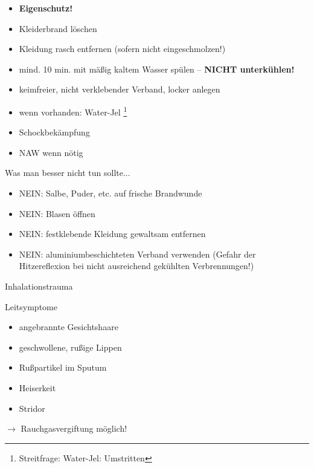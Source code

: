 \documentclass{article}
\newcommand\gEs[1]{\textbf{\textcolor[rgb]{0.0,0.0,0.5019608}{#1}}}
\newcommand\gEs[1]{\textbf{\textcolor[rgb]{0.0,0.0,0.5019608}{#1}}}
\begin{document}
\begin{itemize}
\item {\mdseries\color[rgb]{0.0,0.0,0.5019608}
\gEs{Eigenschutz!}}

\item {\mdseries\color[rgb]{0.0,0.0,0.5019608}
Kleiderbrand l\"oschen}

\item {\mdseries\color[rgb]{0.0,0.0,0.5019608}
Kleidung rasch entfernen (sofern nicht  eingeschmolzen!)}

\item {\mdseries\color[rgb]{0.0,0.0,0.5019608}
mind. 10 min. mit m\"a{\ss}ig kaltem Wasser  sp\"ulen --
\gEs{NICHT unterk\"uhlen!}}

\item {\mdseries\color[rgb]{0.0,0.0,0.5019608}
keimfreier, nicht verklebender Verband, locker anlegen }

\item {\mdseries\color[rgb]{0.0,0.0,0.5019608}
wenn vorhanden: Water-Jel%
%
\footnote{Streitfrage: Water-Jel: Umstritten} }

\item {\mdseries\color[rgb]{0.0,0.0,0.5019608}
Schockbek\"ampfung}

\item {\mdseries\color[rgb]{0.0,0.0,0.5019608}
NAW wenn n\"otig}

\end{itemize}
{\mdseries\color{black}
Was man besser nicht tun sollte...}

\begin{itemize}
\item {\mdseries
NEIN: Salbe, Puder, etc. auf frische  Brandwunde}

\item {\mdseries
NEIN: Blasen \"offnen}

\item {\mdseries
NEIN: festklebende Kleidung gewaltsam  entfernen}

\item {\mdseries
NEIN: aluminiumbeschichteten Verband  verwenden (Gefahr der
Hitzereflexion bei  nicht ausreichend gek\"uhlten  Verbrennungen!)}

\end{itemize}
{\mdseries\color[rgb]{0.0,0.0,0.5019608}
%
%
Inhalationstrauma}

{\mdseries\color{black}
Leitsymptome}

\begin{itemize}
\item {\mdseries
angebrannte Gesichtshaare}

\item {\mdseries
geschwollene, ru{\ss}ige Lippen}

\item {\mdseries
Ru{\ss}partikel im Sputum}

\item {\mdseries
Heiserkeit}

\item {\mdseries
Stridor}

\end{itemize}
{\mdseries
${\rightarrow}$ Rauchgasvergiftung m\"oglich!}
\end{document}
